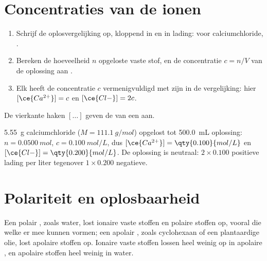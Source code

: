 \section{Concentraties van de ionen}

\begin{method}\label{met:g11:dissolution:ions}
\begin{enumerate}
  \item Schrijf de oplosvergelijking op, kloppend in  en in lading:
        voor calciumchloride, .
  \item Bereken de hoeveelheid $n$ opgeloste vaste stof, en de
        concentratie $c = n / V$ van de oplossing aan .
  \item Elk  heeft de concentratie $c$ vermenigvuldigd met zijn
         in de vergelijking: hier $[\ce{Ca^{2+}}] = c$ en
        $[\ce{Cl-}] = 2c$.
\end{enumerate}
De vierkante haken $[\ldots]$ geven de  van een
 aan.
\end{method}

\begin{example}[Calciumchloride]\label{ex:g11:dissolution:cacl2}
\qty{5.55}{g} calciumchloride ($M = \qty{111.1}{g/mol}$) opgelost tot
\qty{500.0}{mL} oplossing: $n = \qty{0.0500}{mol}$,
$c = \qty{0.100}{mol/L}$, dus $[\ce{Ca^{2+}}] = \qty{0.100}{mol/L}$ en
$[\ce{Cl-}] = \qty{0.200}{mol/L}$. De oplossing is neutraal: $2 \times
0.100$ positieve lading per liter tegenover $1 \times 0.200$ negatieve.
\end{example}

\section{Polariteit en oplosbaarheid}

\begin{proposition}\label{prop:g11:dissolution:like}
Een polair , zoals water, lost ionaire vaste stoffen en
polaire stoffen op, vooral die welke er  mee kunnen
vormen; een apolair , zoals cyclohexaan of een plantaardige
olie, lost apolaire stoffen op. Ionaire vaste stoffen lossen heel weinig
op in apolaire , en apolaire stoffen heel weinig in water.
\end{proposition}


